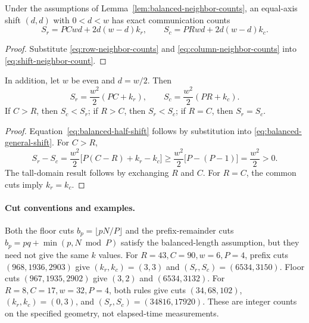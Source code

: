 \begin{theorem}
\label{thm:balanced-equal-axis-shift}
Under the assumptions of Lemma~\ref{lem:balanced-neighbor-counts}, an equal-axis
shift $(d,d)$ with $0<d<w$ has exact communication counts
\begin{equation}
 \boxed{S_r=PCwd+2d(w-d)k_r,\qquad
 S_c=PRwd+2d(w-d)k_c.}
 \label{eq:balanced-general-shift}
\end{equation}
\end{theorem}
\begin{proof}
Substitute \eqref{eq:row-neighbor-counts} and
\eqref{eq:column-neighbor-counts} into
\eqref{eq:shift-neighbor-count}.
\end{proof}

\begin{corollary}
\label{cor:balanced-half-window-orientation}
In addition, let $w$ be even and $d=w/2$. Then
\begin{equation}
 S_r=\frac{w^2}{2}(PC+k_r),\qquad
 S_c=\frac{w^2}{2}(PR+k_c).
 \label{eq:balanced-half-shift}
\end{equation}
If $C>R$, then $S_c<S_r$; if $R>C$, then $S_r<S_c$; if $R=C$, then $S_r=S_c$.
\end{corollary}
\begin{proof}
Equation~\eqref{eq:balanced-half-shift} follows by substitution into
\eqref{eq:balanced-general-shift}. For $C>R$,
\begin{equation}
 S_r-S_c
 =\frac{w^2}{2}\bigl[P(C-R)+k_r-k_c\bigr]
 \ge\frac{w^2}{2}\bigl[P-(P-1)\bigr]
 =\frac{w^2}{2}>0.
\end{equation}
The tall-domain result follows by exchanging $R$ and $C$.
For $R=C$, the common cuts imply $k_r=k_c$.
\end{proof}

\paragraph{Cut conventions and examples.}
Both the floor cuts $b_p=\lfloor pN/P\rfloor$ and the prefix-remainder cuts
$b_p=pq+\min(p,N\bmod P)$ satisfy the balanced-length assumption,
but they need not give the same $k$ values.
For $R=43,C=90,w=6,P=4$, prefix cuts $(968,1936,2903)$ give
$(k_r,k_c)=(3,3)$ and $(S_r,S_c)=(6534,3150)$.
Floor cuts $(967,1935,2902)$ give $(3,2)$ and $(6534,3132)$.
For $R=8,C=17,w=32,P=4$, both rules give cuts $(34,68,102)$,
$(k_r,k_c)=(0,3)$, and $(S_r,S_c)=(34816,17920)$.
These are integer counts on the specified geometry, not elapsed-time measurements.

